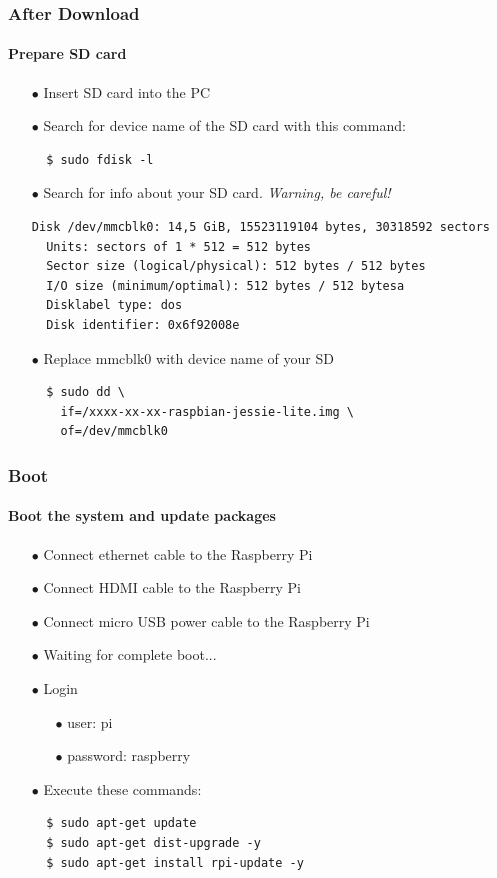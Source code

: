 \documentclass{beamer}
\begin{document}

\begin{frame}[fragile]
\frametitle{\textbf{After Download}}
\framesubtitle{\textbf{Prepare SD card}}
\begin{itemize}
\item[$\bullet$] Insert SD card into the PC
\item[$\bullet$] Search for device name of the SD card with this command:
\begin{lstlisting}
  $ sudo fdisk -l
\end{lstlisting}
\item[$\bullet$] Search for info about your SD card. \textit{Warning, be careful!}
\begin{lstlisting}[basicstyle=\tiny\ttfamily]
  Disk /dev/mmcblk0: 14,5 GiB, 15523119104 bytes, 30318592 sectors      
  Units: sectors of 1 * 512 = 512 bytes                                 
  Sector size (logical/physical): 512 bytes / 512 bytes                 
  I/O size (minimum/optimal): 512 bytes / 512 bytesa                    
  Disklabel type: dos                                                   
  Disk identifier: 0x6f92008e                                           
\end{lstlisting}
\item[$\bullet$] Replace mmcblk0 with device name of your SD
\begin{lstlisting}
  $ sudo dd \
    if=/xxxx-xx-xx-raspbian-jessie-lite.img \
    of=/dev/mmcblk0
\end{lstlisting}
\end{itemize}

\end{frame}


\begin{frame}[fragile]
	\frametitle{\textbf{Boot}}
	\framesubtitle{\textbf{Boot the system and update packages}}

		\begin{itemize}
			\item[$\bullet$] Connect ethernet cable to the Raspberry Pi
			\item[$\bullet$] Connect HDMI cable to the Raspberry Pi
			\item[$\bullet$] Connect micro USB power cable to the Raspberry Pi
			\item[$\bullet$] Waiting for complete boot...
			\item[$\bullet$] Login
			\begin{itemize}
				\item[$\bullet$] user: pi
				\item[$\bullet$] password: raspberry
			\end{itemize}
			\item[$\bullet$] Execute these commands:
			\begin{lstlisting}
  $ sudo apt-get update
  $ sudo apt-get dist-upgrade -y
  $ sudo apt-get install rpi-update -y
			\end{lstlisting}
		\end{itemize}
\end{frame}
\end{document}
